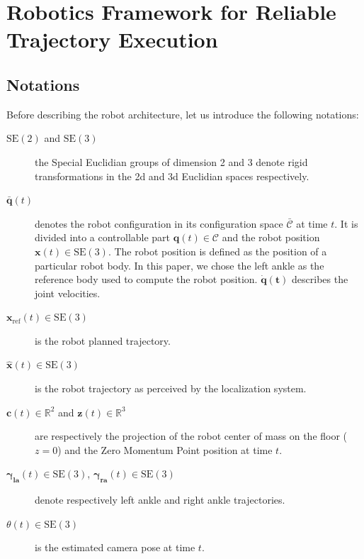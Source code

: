 \section{Robotics Framework for Reliable Trajectory Execution}\label{sec:architecture}

\subsection{Notations}

Before describing the robot architecture, let us introduce the
following notations:

\begin{description}
\item[$\text{SE}(2)$ and $\text{SE}(3)$]\hspace{1.45cm} the Special
  Euclidian groups of dimension 2 and 3 denote rigid transformations
  in the 2d and 3d Euclidian spaces respectively.
\item[$\mathbf{\bar{q}}(t)$] denotes the robot configuration in its
  configuration space $\mathcal{\bar{C}}$ at time $t$. It is divided
  into a controllable part $\mathbf{q}(t) \in \mathcal{C}$ and the
  robot position $\mathbf{x}(t) \in \text{SE}(3)$. The robot position
  is defined as the position of a particular robot body. In this
  paper, we chose the left ankle as the reference body used to compute
  the robot position. $\mathbf{\dot{q}(t)}$ describes the joint
  velocities.
\item[$\mathbf{x}_{\text{ref}}(t) \in \text{SE}(3)$] \hspace{1.2cm} is
  the robot planned trajectory.
\item[$\mathbf{\hat{x}}(t) \in \text{SE}(3)$] \hspace{.8cm} is the
  robot trajectory as perceived by the localization system.
\item[$\mathbf{c}(t) \in \mathbb{R}^2$ and $\mathbf{z}(t) \in
  \mathbb{R}^3$]\hspace{2.6cm} are respectively the projection of the
  robot center of mass on the floor ($z = 0$) and the Zero Momentum
  Point position at time $t$.
\item[$\mathbf{\gamma_{\text{la}}}(t) \in \text{SE}(3)$, $\mathbf{\gamma_{\text{ra}}}(t)
  \in \text{SE}(3)$]\hspace{3.4cm} denote respectively left ankle and
  right ankle trajectories.
\item[$\theta(t) \in \text{SE}(3)$]\hspace{0.8cm} is the estimated
  camera pose at time $t$.
\end{description}

